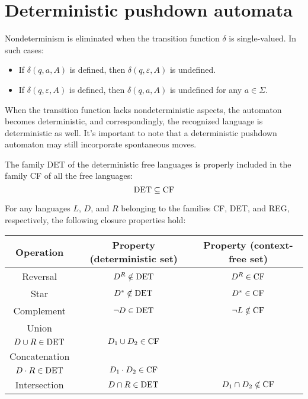 \section{Deterministic pushdown automata}

Nondeterminism is eliminated when the transition function $\delta$ is single-valued. 
In such cases:
\begin{itemize}
    \item If $\delta (q, a, A)$ is defined, then $\delta(q, \varepsilon, A)$ is undefined. 
    \item If $\delta(q, \varepsilon, A)$ is defined, then $\delta (q, a, A)$ is undefined for any $a \in \Sigma$.
\end{itemize}
When the transition function lacks nondeterministic aspects, the automaton becomes deterministic, and correspondingly, the recognized language is deterministic as well. 
It's important to note that a deterministic pushdown automaton may still incorporate spontaneous moves.

\begin{property}
    The family DET of the deterministic free languages is properly included in the family CF of all the free languages: 
    \[\textnormal{DET} \subseteq \textnormal{CF}\]
\end{property}

For any languages $L$, $D$, and $R$ belonging to the families CF, DET, and REG, respectively, the following closure properties hold:
\begin{table}[H]
    \centering
    \begin{tabular}{ccc}
    \hline
    \textbf{Operation} & \textbf{Property (deterministic set)}                                                & \textbf{Property (context-free set)}  \\ \hline
    Reversal           & $D^R \notin \textnormal{DET}$                                                        & $D^R \in \textnormal{CF}$             \\
    Star               & $D^{*} \notin \textnormal{DET}$                                                      & $D^{*} \in \textnormal{CF}$           \\
    Complement         & $\lnot D \in \textnormal{DET}$                                                       & $\lnot L \notin \textnormal{CF}$      \\
    Union              & \makecell{$D_1 \cup D_2 \notin \textnormal{DET}$ \\ $D \cup R \in \textnormal{DET}$}   & $D_1 \cup D_2 \in \textnormal{CF}$    \\
    Concatenation      & \makecell{$D_1 \cdot D_2 \notin \textnormal{DET}$ \\ $D \cdot R \in \textnormal{DET}$} & $D_1 \cdot D_2 \in \textnormal{CF}$   \\
    Intersection       & $D \cap R \in \textnormal{DET}$                                                      & $D_1 \cap D_2 \notin \textnormal{CF}$ \\ \hline
    \end{tabular}
\end{table}